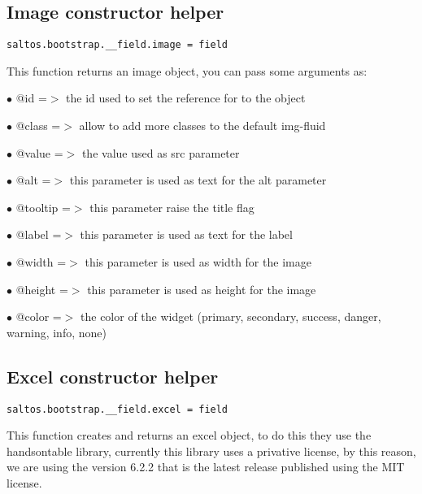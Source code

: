 \documentclass[a4paper]{book}
\begin{document}
\hypertarget{toc481}{}
\subsection{Image constructor helper}

\begin{lstlisting}
saltos.bootstrap.__field.image = field
\end{lstlisting}

This function returns an image object, you can pass some arguments as:

\begin{compactitem}
\item[\color{myblue}$\bullet$] @id      =$>$ the id used to set the reference for to the object
\item[\color{myblue}$\bullet$] @class   =$>$ allow to add more classes to the default img-fluid
\item[\color{myblue}$\bullet$] @value   =$>$ the value used as src parameter
\item[\color{myblue}$\bullet$] @alt     =$>$ this parameter is used as text for the alt parameter
\item[\color{myblue}$\bullet$] @tooltip =$>$ this parameter raise the title flag
\item[\color{myblue}$\bullet$] @label   =$>$ this parameter is used as text for the label
\item[\color{myblue}$\bullet$] @width   =$>$ this parameter is used as width for the image
\item[\color{myblue}$\bullet$] @height  =$>$ this parameter is used as height for the image
\item[\color{myblue}$\bullet$] @color   =$>$ the color of the widget (primary, secondary, success, danger, warning, info, none)
\end{compactitem}

\hypertarget{toc482}{}
\subsection{Excel constructor helper}

\begin{lstlisting}
saltos.bootstrap.__field.excel = field
\end{lstlisting}

This function creates and returns an excel object, to do this they use the handsontable library,
currently this library uses a privative license, by this reason, we are using the version 6.2.2
that is the latest release published using the MIT license.
\end{document}
